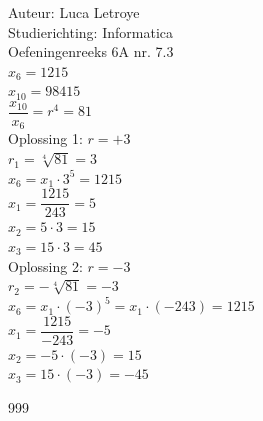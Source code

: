 \documentclass[a4paper]{article}
\begin{document}
  
\noindent \large Auteur: Luca Letroye \\
\noindent \large Studierichting: Informatica\\
\noindent \large Oefeningenreeks 6A nr. 7.3\\
\medskip
\normalsize
$x_6 = 1215$\\

$x_{10} = 98415$\\

$\dfrac{x_{10}}{x_6} = r^4 = 81$\\

\noindent Oplossing 1: $r = +3$\\

$r_1 = \sqrt[4]{81} = 3$\\

$x_6 = x_1 \cdot 3^5 = 1215$\\

$x_1= \dfrac{1215}{243} = 5$\\

$x_2 = 5\cdot 3 = 15$\\

$x_3 = 15\cdot 3 = 45$\\

\noindent Oplossing 2: $r = -3$\\

$r_2 = -\sqrt[4]{81} = -3$\\

$x_6 = x_1 \cdot (-3)^5 = x_1 \cdot (-243) = 1215$\\

$x_1= \dfrac{1215}{-243} = -5$\\

$x_2 = -5\cdot (-3) = 15$\\

$x_3 = 15\cdot (-3) = -45$

\begin{thebibliography}{999}
\end{thebibliography}
\end{document}
